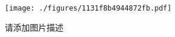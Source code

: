 
\begin{figure}[ht]
\centering
\texttt{[image: ./figures/1131f8b4944872fb.pdf]}
\caption{请添加图片描述} \label{fig_thanks_1}
\end{figure}
